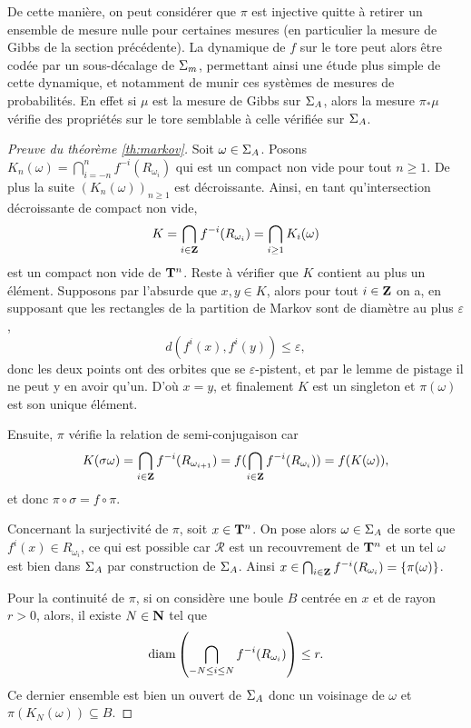   De cette manière, on peut considérer que $\pi$ est injective quitte à retirer un ensemble
  de mesure nulle pour certaines mesures (en particulier la mesure de Gibbs de la section précédente).
  La dynamique de $f$ sur le tore peut alors être codée par un sous-décalage de $\Sigma_m$,
  permettant ainsi une étude plus simple de cette dynamique, et notamment de munir ces systèmes de mesures de probabilités.
  En effet si $\mu$ est la mesure de Gibbs sur $\Sigma_A$,
  alors la mesure $\pi_* \mu$ vérifie des propriétés sur le tore semblable à celle vérifiée sur $\Sigma_A$.

  \begin{proof}[Preuve du théorème \ref{th:markov}]
    Soit $\omega \in \Sigma_A$. Posons $K_n(\omega) = \bigcap_{i=-n}^n{f^{-i}(R_{\omega_i})}$ qui est un compact non vide pour tout $n \geq 1$.
    De plus la suite $(K_n(\omega))_{n \geq 1}$ est décroissante.
    Ainsi, en tant qu'intersection décroissante de compact non vide,
    $$K = \bigcap_{i\in\mathbf Z}{f^{-i}(R_{\omega_i})} = \bigcap_{i\geq 1}{K_i(\omega)}$$
    est un compact non vide de $\mathbf T^n$.
    Reste à vérifier que $K$ contient au plus un élément.
    Supposons par l'absurde que $x, y \in K$, alors pour tout $i \in \mathbf Z$ on a,
    en supposant que les rectangles de la partition de Markov sont de diamètre au plus $\varepsilon$,
    $$d(f^i(x), f^i(y)) \leq \varepsilon,$$
    donc les deux points ont des orbites que se $\varepsilon$-pistent, et par le lemme de pistage il ne peut y en avoir qu'un.
    D'où $x=y$, et finalement $K$ est un singleton et $\pi(\omega)$ est son unique élément.

    Ensuite, $\pi$ vérifie la relation de semi-conjugaison car
    $$K(\sigma\omega) = \bigcap_{i\in\mathbf Z}{f^{-i}(R_{\omega_{i+1}})} = f(\bigcap_{i\in\mathbf Z}{f^{-i}(R_{\omega_i})}) = f(K(\omega)),$$
    et donc $\pi \circ \sigma = f \circ \pi$.

    Concernant la surjectivité de $\pi$, soit $x \in \mathbf T^n$.
    On pose alors $\omega \in \Sigma_A$ de sorte que $f^i(x) \in R_{\omega_i}$,
    ce qui est possible car $\mathcal R$ est un recouvrement de $\mathbf T^n$ et
    un tel $\omega$ est bien dans $\Sigma_A$ par construction de $\Sigma_A$.
    Ainsi $x \in \bigcap_{i\in\mathbf Z}{f^{-i}(R_{\omega_i})} = \{\pi(\omega)\}$.

    Pour la continuité de $\pi$, si on considère une boule $B$ centrée en $x$ et de rayon $r > 0$,
    alors, il existe $N \in \mathbf N$ tel que
    $$\operatorname{diam}{\left(\bigcap_{-N\leq i\leq N}{f^{-i}(R_{\omega_i})}\right)} \leq r.$$
    Ce dernier ensemble est bien un ouvert de $\Sigma_A$ donc un voisinage de $\omega$ et $\pi(K_N(\omega)) \subseteq B$.


\end{proof}
